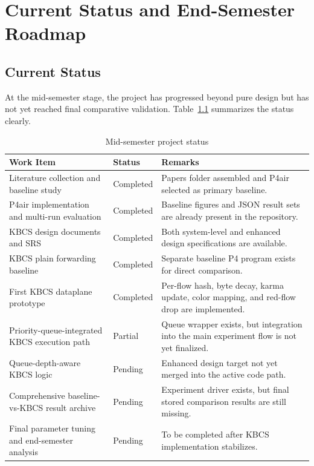 \documentclass[12pt,a4paper]{report}
\begin{document}
\chapter{Current Status and End-Semester Roadmap}

\section{Current Status}
At the mid-semester stage, the project has progressed beyond pure design but has not yet reached final comparative validation. Table~\ref{tab:status_table} summarizes the status clearly.

\begin{table}[H]
\centering
\caption{Mid-semester project status}
\label{tab:status_table}
\renewcommand{\arraystretch}{1.35}
\begin{tabularx}{\textwidth}{@{}p{6.0cm}p{2.6cm}X@{}}
\toprule
\textbf{Work Item} & \textbf{Status} & \textbf{Remarks} \\
\midrule
Literature collection and baseline study & Completed & Papers folder assembled and P4air selected as primary baseline. \\
P4air implementation and multi-run evaluation & Completed & Baseline figures and JSON result sets are already present in the repository. \\
KBCS design documents and SRS & Completed & Both system-level and enhanced design specifications are available. \\
KBCS plain forwarding baseline & Completed & Separate baseline P4 program exists for direct comparison. \\
First KBCS dataplane prototype & Completed & Per-flow hash, byte decay, karma update, color mapping, and red-flow drop are implemented. \\
Priority-queue-integrated KBCS execution path & Partial & Queue wrapper exists, but integration into the main experiment flow is not yet finalized. \\
Queue-depth-aware KBCS logic & Pending & Enhanced design target not yet merged into the active code path. \\
Comprehensive baseline-vs-KBCS result archive & Pending & Experiment driver exists, but final stored comparison results are still missing. \\
Final parameter tuning and end-semester analysis & Pending & To be completed after KBCS implementation stabilizes. \\
\bottomrule
\end{tabularx}
\end{table}
\end{document}
